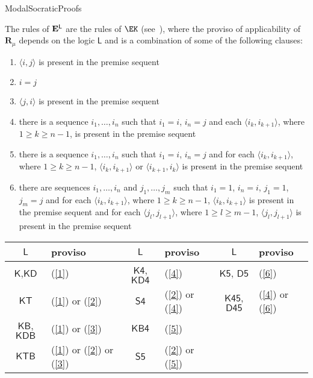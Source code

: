 \begin{entry}{ModalSocraticProofs}  

\begin{calculus}

The rules of $\mathbf{E}^\mathsf{L}$ are the rules of $\EK$ (see~), where the proviso of applicability of $\mathbf{R}_\mu$ depends on the logic $\mathsf{L}$ and is a combination of some of the following clauses:

\begin{enumerate}
\item\label{1} $\langle i, j \rangle$ is present in the premise sequent
\item\label{2} $i = j$
\item\label{3} $\langle j, i \rangle$ is present in the premise sequent
\item\label{4} there is a sequence $i_1, \ldots, i_n$ such that $i_1 = i$, $i_n = j$ and each $\langle i_k, i_{k+1} \rangle$, where $1 \geq k \geq n-1$, is present in the premise sequent
\item\label{5} there is a sequence $i_1, \ldots, i_n$ such that $i_1 = i$, $i_n = j$ and for each $\langle i_k, i_{k+1} \rangle$, where $1 \geq k \geq n-1$, $\langle i_k, i_{k+1} \rangle$ or $\langle i_{k+1}, i_{k} \rangle$ is present in the premise sequent
\item\label{6} there are sequences $i_1, \ldots, i_n$ and $j_1, \ldots, j_m$ such that $i_1 = 1$, $i_n = i$, $j_1 = 1$, $j_m = j$ and for each $\langle i_k, i_{k+1} \rangle$, where $1 \geq k \geq n-1$, $\langle i_k, i_{k+1} \rangle$ is present in the premise sequent and for each $\langle j_l, j_{l+1} \rangle$, where $1 \geq l \geq m-1$, $\langle j_l, j_{l+1} \rangle$ is present in the premise sequent
\end{enumerate}

\smallskip


\begin{center}
\begin{tabular}{c|l||c|l||c|l}
$\mathsf{L}$ 				& proviso & $\mathsf{L}$ 		& proviso & $\mathsf{L}$ 		& proviso \\
\hline
$\mathsf{K}$,$\mathsf{KD}$	& (\ref{1}) & $\mathsf{K4}$, $\mathsf{KD4}$ & (\ref{4}) & $\mathsf{K5}$, $\mathsf{D5}$ & (\ref{6}) \\
$\mathsf{KT}$				& (\ref{1}) or (\ref{2}) & $\mathsf{S4}$		& (\ref{2}) or (\ref{4}) & $\mathsf{K45}$, $\mathsf{D45}$ & (\ref{4}) or (\ref{6}) \\
$\mathsf{KB}$, $\mathsf{KDB}$ & (\ref{1}) or (\ref{3}) & $\mathsf{KB4}$	& (\ref{5}) && \\
$\mathsf{KTB}$				& (\ref{1}) or (\ref{2}) or (\ref{3}) & $\mathsf{S5}$	& (\ref{2}) or (\ref{5})
\end{tabular}
\end{center}


\end{calculus}
\end{entry}
